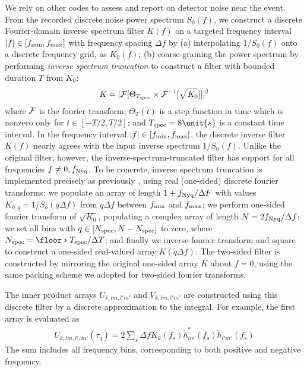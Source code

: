 We rely on other codes to assess and report on detector noise near the event.   From the recorded discrete noise power
spectrum $S_0(f)$, we construct a discrete Fourier-domain inverse spectrum filter $K(f)$ on a targeted frequency interval $|f|
\in [f_{\rm min}, f_{\rm max}]$ with frequency spacing $\Delta f$ by 
(a) interpolating $1/S_0(f)$ onto a discrete frequency grid, as $K_0(f)$; 
(b) coarse-graining the power spectrum by performing \emph{inverse spectrum truncation} \cite{2012PhRvD..85l2006A} to construct a filter with bounded duration $T$ from $K_0$:
\begin{eqnarray}
 K =  |{\cal F} [\Theta_{T_{\rm spec}} \times {\cal F}^{-1}[ \sqrt{K_0} ]]|^2
\end{eqnarray}
where ${\cal F}$ is the fourier transform; $\Theta_T(t)$ is a step function in time which is nonzero only for $t\in[-T/2,T/2]$; and $T_{\rm spec}=8\unit{s}$ is a
constant time interval. 
%
In the frequency interval $|f|\in[f_{\rm min},f_{\rm max}]$, the discrete inverse filter $K(f)$ nearly agrees with the
input inverse spectrum $1/S_0(f)$.  Unlike the original filter, however, the inverse-spectrum-truncated filter has
support for all frequencies $f\ne 0,f_{\rm Nyq}$.     
%
To be concrete, inverse spectrum truncation is implemented precisely as previously  \cite{2012PhRvD..85l2006A}, using
real (one-sided) discrete fourier transforms: 
%
we populate an array of length $1+f_{\rm Nyq}/\Delta F$ with values $K_{0,q} =1/S_o(q \Delta f)$ from $q\Delta f$ between $f_{\rm min}$ and $f_{\rm max}$; 
we perform one-sided fourier transform of $\sqrt{K_{0}}$, populating a complex array of length $N=2 f_{\rm Nyq}/\Delta f$; 
we set all bins with $q\in [N_{\rm spec}, N-N_{\rm spec}]$ to zero, where $N_{\rm spec} = \floor*{T_{\rm spec}/\Delta
  T}$; 
and  finally we inverse-fourier transform and square to construct a one-sided real-valued array $K(q\Delta f)$.  
%
The two-sided filter is constructed by mirroring the original one-sided array $K$ about $f=0$, using the same packing
scheme we adopted for two-sided fourier transforms.  

The inner product arrays $U_{k,lm,l'm'}$ and $V_{k,lm,l'm'}$ are constructed using this discrete filter by a discrete
approximation to the integral.  For example, the first array is evaluated as
\begin{eqnarray}
U_{k,lm,l',m'}(\tau_q) = 2 \sum_s \Delta f  K_k(f_s) \tilde{h}_{lm}^*(f_s) \tilde{h}_{l'm'}(f_s)
\end{eqnarray}
The sum includes all frequency bins, corresponding to both positive and negative frequency.  %


